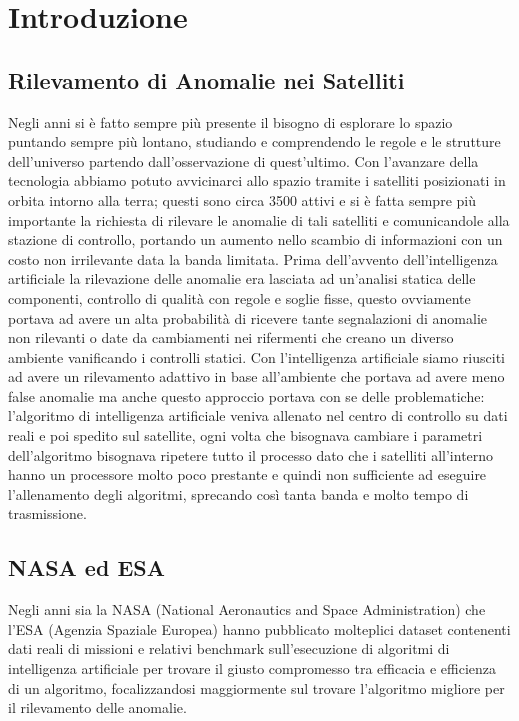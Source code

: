 \chapter{Introduzione}
\section{Rilevamento di Anomalie nei Satelliti}
Negli anni si è fatto sempre più presente il bisogno di esplorare lo spazio puntando sempre più lontano, studiando e comprendendo le regole e le strutture dell'universo partendo dall'osservazione di quest'ultimo. Con l'avanzare della tecnologia abbiamo potuto avvicinarci allo spazio tramite i satelliti posizionati in orbita intorno alla terra; questi sono circa 3500 attivi e si è fatta sempre più importante la richiesta di rilevare le anomalie di tali satelliti e comunicandole alla stazione di controllo, portando un aumento nello scambio di informazioni con un costo non irrilevante data la banda limitata.
Prima dell'avvento dell'intelligenza artificiale la rilevazione delle anomalie era lasciata ad un'analisi statica delle componenti, controllo di qualità con regole e soglie fisse, questo ovviamente portava ad avere un alta probabilità di ricevere tante segnalazioni di anomalie non rilevanti o date da cambiamenti nei rifermenti che creano un diverso ambiente vanificando i controlli statici.
Con l'intelligenza artificiale siamo riusciti ad avere un rilevamento adattivo in base all'ambiente che portava ad avere meno false anomalie ma anche questo approccio portava con se delle problematiche: l'algoritmo di intelligenza artificiale veniva allenato nel centro di controllo su dati reali e poi spedito sul satellite, ogni volta che bisognava cambiare i parametri dell'algoritmo bisognava ripetere tutto il processo dato che i satelliti all'interno hanno un processore molto poco prestante e quindi non sufficiente ad eseguire l'allenamento degli algoritmi, sprecando così tanta banda e molto tempo di trasmissione.

\section{NASA ed ESA}
Negli anni sia la NASA (National Aeronautics and Space Administration) che l'ESA (Agenzia Spaziale Europea) hanno pubblicato molteplici dataset contenenti dati reali di missioni e relativi benchmark sull'esecuzione di algoritmi di intelligenza artificiale per trovare il giusto compromesso tra efficacia e efficienza di un algoritmo, focalizzandosi maggiormente sul trovare l'algoritmo migliore per il rilevamento delle anomalie.

